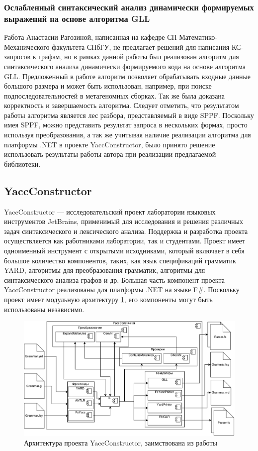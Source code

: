 \documentclass[14pt]{matmex-diploma-custom}
\begin{document}
		\subsubsection*{Ослабленный синтаксический анализ динамически формируемых выражений на основе алгоритма GLL}
		Работа Анастасии Рагозиной, написанная на кафедре СП Математико-Механического факультета СПбГУ, не предлагает решений для написания КС-запросов к графам, но в рамках данной работы был реализован алгоритм для синтаксического анализа динамически формируемого кода на основе алгоритма GLL. Предложенный в работе алгоритм позволяет обрабатывать входные данные большого размера и может быть использован, например, при поиске подпоследовательностей в метагеномных сборках. Так же была доказана корректность и завершаемость алгоритма. Следует отметить, что результатом работы алгоритма является лес разбора, представляемый в виде SPPF\cite{SPPF}. Поскольку имея SPPF, можно представить результат запроса в нескольких формах, просто используя преобразования, а так же учитывая наличие реализации алгоритма для платформы .NET в проекте YaccConstructor, было принято решение использовать результаты работы автора при реализации предлагаемой библиотеки.
	\subsection{YaccConstructor}
	    YaccConstructor --- исследовательский проект лаборатории языковых инструментов JetBrains, применимый для исследования и решения различных задач синтаксического и лексического анализа. Поддержка и разработка проекта осуществляется как работниками лаборатории, так и студентами. Проект имеет одноименный инструмент с открытыми исходниками, который включает в себя большое количество компонентов, таких, как язык спецификаций грамматик YARD, алгоритмы для преобразования грамматик, алгоритмы для синтаксического анализа графов и др. Большая часть компонент проекта YaccConstructor реализованы для платформы .NET на языке F\#. Поскольку проект имеет модульную архитектуру \ref{arch}, его компоненты могут быть использованы независимо.
	    
        \begin{figure}
            \centering
            \includegraphics[width=\textwidth]{pics/YCArch.pdf}
            \caption{Архитектура проекта YaccConstructor, заимствована из работы \cite{gsv_phd} \label{arch}}
        \end{figure}
	    
\end{document}
